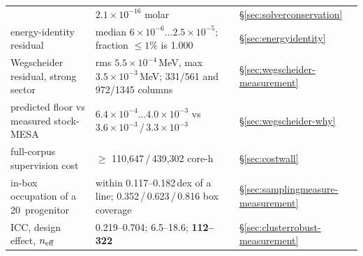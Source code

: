 \begin{longtable}{@{}L{6.6cm} L{4.6cm} L{3.4cm}@{}}
 &
  $2.1\times10^{-16}$ molar & \S\ref{sec:solverconservation} \\
energy-identity residual &
  median $6\times10^{-6}\ldots2.5\times10^{-5}$; fraction $\le 1\%$ is 1.000 &
  \S\ref{sec:energyidentity} \\
Wegscheider residual, strong sector &
  rms $5.5\times10^{-4}$\,MeV, max $3.5\times10^{-3}$\,MeV; 331/561 and 972/1345
  columns & \S\ref{sec:wegscheider-measurement} \\
predicted \kap{} floor vs measured stock-MESA \kap{} &
  $6.4\times10^{-4}\ldots4.0\times10^{-3}$ vs
  $3.6\times10^{-3}$\,/\,$3.3\times10^{-3}$ & \S\ref{sec:wegscheider-why} \\
full-corpus \Phifl{} supervision cost &
  $\ge$ 110,647\,/\,439,302 core-h & \S\ref{sec:costwall} \\
in-box occupation of a 20\,\Msun{} progenitor &
  within 0.117--0.182\,dex of a line; 0.352\,/\,0.623\,/\,0.816 box coverage &
  \S\ref{sec:samplingmeasure-measurement} \\
ICC, design effect, $n_{\rm eff}$ &
  0.219--0.704; 6.5--18.6; \textbf{112--322} &
  \S\ref{sec:clusterrobust-measurement} \\
\end{longtable}
\endgroup

\clearpage
\tableofcontents
\clearpage
